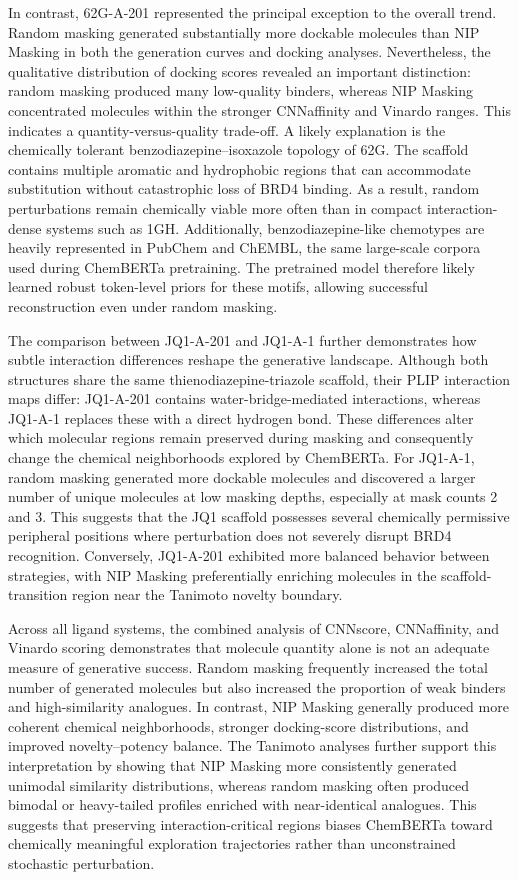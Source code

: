 \documentclass[a4paper,12pt]{article}
\begin{document}
In contrast, 62G-A-201 represented the principal exception to the overall trend. Random masking generated substantially more dockable molecules than NIP Masking  in both the generation curves and docking analyses. Nevertheless, the qualitative distribution of docking scores revealed an important distinction: random masking produced many low-quality binders, whereas NIP Masking  concentrated molecules within the stronger CNNaffinity and Vinardo ranges. This indicates a quantity-versus-quality trade-off. A likely explanation is the chemically tolerant benzodiazepine–isoxazole topology of 62G. The scaffold contains multiple aromatic and hydrophobic regions that can accommodate substitution without catastrophic loss of BRD4 binding. As a result, random perturbations remain chemically viable more often than in compact interaction-dense systems such as 1GH. Additionally, benzodiazepine-like chemotypes are heavily represented in PubChem and ChEMBL, the same large-scale corpora used during ChemBERTa pretraining. The pretrained model therefore likely learned robust token-level priors for these motifs, allowing successful reconstruction even under random masking.

The comparison between JQ1-A-201 and JQ1-A-1 further demonstrates how subtle interaction differences reshape the generative landscape. Although both structures share the same thienodiazepine-triazole scaffold, their PLIP interaction maps differ: JQ1-A-201 contains water-bridge-mediated interactions, whereas JQ1-A-1 replaces these with a direct hydrogen bond. These differences alter which molecular regions remain preserved during masking and consequently change the chemical neighborhoods explored by ChemBERTa. For JQ1-A-1, random masking generated more dockable molecules and discovered a larger number of unique molecules at low masking depths, especially at mask counts 2 and 3. This suggests that the JQ1 scaffold possesses several chemically permissive peripheral positions where perturbation does not severely disrupt BRD4 recognition. Conversely, JQ1-A-201 exhibited more balanced behavior between strategies, with NIP Masking  preferentially enriching molecules in the scaffold-transition region near the Tanimoto novelty boundary.

Across all ligand systems, the combined analysis of CNNscore, CNNaffinity, and Vinardo scoring demonstrates that molecule quantity alone is not an adequate measure of generative success. Random masking frequently increased the total number of generated molecules but also increased the proportion of weak binders and high-similarity analogues. In contrast, NIP Masking  generally produced more coherent chemical neighborhoods, stronger docking-score distributions, and improved novelty–potency balance. The Tanimoto analyses further support this interpretation by showing that NIP Masking  more consistently generated unimodal similarity distributions, whereas random masking often produced bimodal or heavy-tailed profiles enriched with near-identical analogues. This suggests that preserving interaction-critical regions biases ChemBERTa toward chemically meaningful exploration trajectories rather than unconstrained stochastic perturbation.
\end{document}
